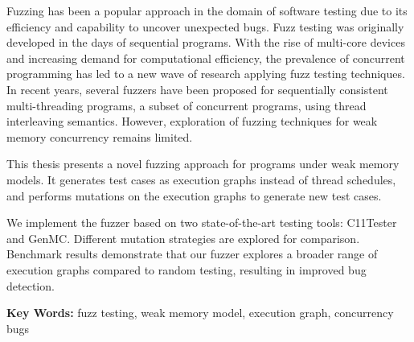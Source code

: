 
Fuzzing has been a popular approach in the domain of software testing due to its efficiency and capability to uncover  unexpected bugs. Fuzz testing was originally developed in the days of sequential programs. With the rise of multi-core devices and increasing demand for computational efficiency, the prevalence of concurrent programming has led to a new wave of research applying fuzz testing techniques. In recent years, several fuzzers have been proposed for sequentially consistent multi-threading programs, a subset of concurrent programs, using thread interleaving semantics. However, exploration of fuzzing techniques for weak memory concurrency remains limited.

This thesis presents a novel fuzzing approach for programs under weak memory models. It generates test cases as execution graphs instead of thread schedules, and performs mutations on the execution graphs to generate new test cases.

We implement the fuzzer based on two state-of-the-art testing tools: C11Tester and GenMC. Different mutation strategies are explored for comparison. Benchmark results demonstrate that our fuzzer explores a broader range of execution graphs compared to random testing, resulting in improved bug detection.

\textbf{Key Words:} fuzz testing, weak memory model, execution graph, concurrency bugs

